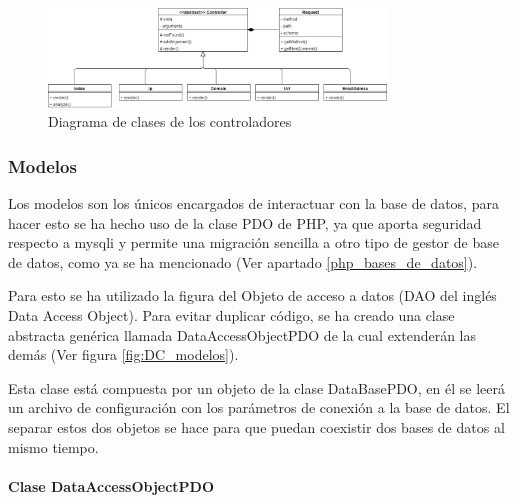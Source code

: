 \begin{figure}[htb]
    \centering
    \includegraphics[width=0.8\textwidth]{imagenes/DiagramasClases/Controladores.png}
\caption{Diagrama de clases de los controladores}
\label{fig:DC_controladores}
\end{figure}

\subsubsection{Modelos}
Los modelos son los únicos encargados de interactuar con la base de datos, para hacer esto se ha hecho uso de la clase PDO de PHP, ya que aporta seguridad respecto a mysqli \cite{why_pdo_vs_msqli} y permite una migración sencilla a otro tipo de gestor de base de datos, como ya se ha mencionado (Ver apartado \ref{php_bases_de_datos}).

Para esto se ha utilizado la figura del Objeto de acceso a datos (DAO del inglés Data Access Object). Para evitar duplicar código, se ha creado una clase abstracta genérica llamada DataAccessObjectPDO de la cual extenderán las demás (Ver figura \ref{fig:DC_modelos}).

Esta clase está compuesta por un objeto de la clase DataBasePDO, en él se leerá un archivo de configuración con los parámetros de conexión a la base de datos. 
El separar estos dos objetos se hace para que puedan coexistir dos bases de datos al mismo tiempo.

\paragraph{Clase DataAccessObjectPDO}

